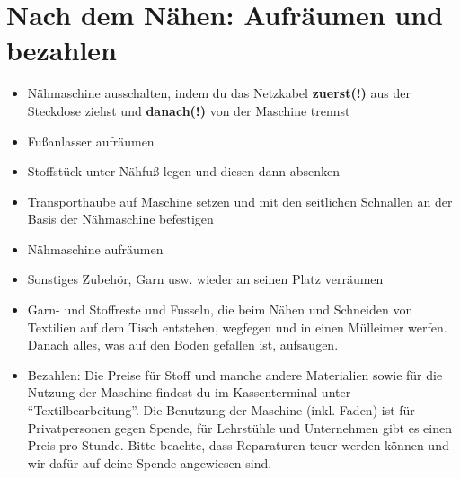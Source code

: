 \documentclass{\basedir/fablab-document}
\begin{document}
\clearpage
\section{Nach dem Nähen: Aufräumen und bezahlen}
\begin{itemize}
	\item Nähmaschine ausschalten, indem du das Netzkabel \textbf{zuerst(!)} aus der Steckdose ziehst und \textbf{danach(!)} von der Maschine trennst
	\item Fußanlasser aufräumen
	\item Stoffstück unter Nähfuß legen und diesen dann absenken
	\item Transporthaube auf Maschine setzen und mit den seitlichen Schnallen an der Basis der Nähmaschine befestigen
	\item Nähmaschine aufräumen
	\item Sonstiges Zubehör, Garn usw. wieder an seinen Platz verräumen
	\item Garn- und Stoffreste und Fusseln, die beim Nähen und Schneiden von Textilien auf dem Tisch entstehen, wegfegen und in einen Mülleimer werfen. Danach alles, was auf den Boden gefallen ist, aufsaugen.
	\item Bezahlen: Die Preise für Stoff und manche andere Materialien sowie für die Nutzung der Maschine findest du im Kassenterminal unter \enquote{Textilbearbeitung}. Die Benutzung der Maschine (inkl. Faden) ist für Privatpersonen gegen Spende, für Lehrstühle und Unternehmen gibt es einen Preis pro Stunde. Bitte beachte, dass Reparaturen teuer werden können und wir dafür auf deine Spende angewiesen sind.
\end{itemize}



\clearpage
\end{document}
